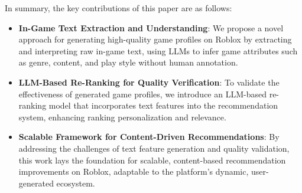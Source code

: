 
In summary, the key contributions of this paper are as follows:
\begin{itemize}[leftmargin=*]
\item \textbf{In-Game Text Extraction and Understanding}: We propose a novel approach for generating high-quality game profiles on Roblox by extracting and interpreting raw in-game text, using LLMs to infer game attributes such as genre, content, and play style without human annotation.
\item \textbf{LLM-Based Re-Ranking for Quality Verification}: To validate the effectiveness of generated game profiles, we introduce an LLM-based re-ranking model that incorporates text features into the recommendation system, enhancing ranking personalization and relevance.
\item \textbf{Scalable Framework for Content-Driven Recommendations}: By addressing the challenges of text feature generation and quality validation, this work lays the foundation for scalable, content-based recommendation improvements on Roblox, adaptable to the platform’s dynamic, user-generated ecosystem.
\end{itemize}